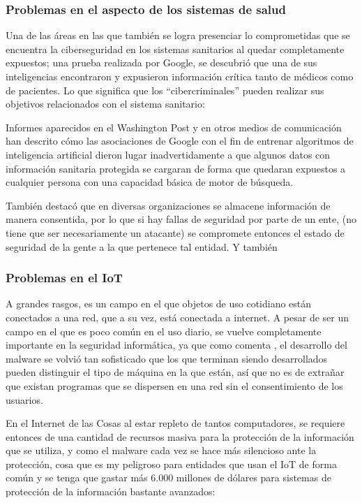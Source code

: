 \subsubsection{Problemas en el aspecto de los sistemas de salud}

Una de las áreas en las que también se logra presenciar lo comprometidas que se
encuentra la ciberseguridad en los sistemas sanitarios al quedar completamente
expuestos; una prueba realizada por Google, se descubrió que una de sus
inteligencias encontraron y expusieron información crítica tanto de médicos
como de pacientes. Lo que significa que los ``cibercriminales'' pueden realizar
sus objetivos relacionados con el sistema sanitario:

\begin{displayquote}
  Informes aparecidos en el Washington Post y en otros medios de comunicación
  han descrito cómo las asociaciones de Google con el fin de entrenar algoritmos
  de inteligencia artificial dieron lugar inadvertidamente a que algunos datos
  con información sanitaria protegida se cargaran de forma que quedaran
  expuestos a cualquier persona con una capacidad básica de motor de búsqueda.
  \parencite[Wakabayashi D, 2019, como se cita en][]{Banja2020}
\end{displayquote}

También \textcite{Banja2020} destacó que en diversas organizaciones se almacene
información de manera consentida, por lo que si hay fallas de seguridad por
parte de un ente, (no tiene que ser necesariamente un atacante) se compromete
entonces el estado de seguridad de la gente a la que pertenece tal entidad. Y
también 

\subsubsection{Problemas en el IoT}

A grandes rasgos, es un campo en el que objetos de uso cotidiano están
conectados a una red, que a su vez, está conectada a internet. A pesar de ser un
campo en el que es poco común en el uso diario, se vuelve completamente
importante en la seguridad informática, ya que como comenta
\textcite{Aboaoja2022}, el desarrollo del malware se volvió tan sofisticado que
los que terminan siendo desarrollados pueden distinguir el tipo de máquina en
la que están, así que no es de extrañar que existan programas que se dispersen
en una red sin el consentimiento de los usuarios.

En el Internet de las Cosas al estar repleto de tantos computadores, se requiere
entonces de una cantidad de recursos masiva para la protección de la información
que se utiliza, y como el malware cada vez se hace más silencioso ante la
protección, cosa que es my peligroso para entidades que usan el IoT de forma
común y se tenga que gastar más 6.000 millones de dólares para sistemas de
protección de la información bastante avanzados:

